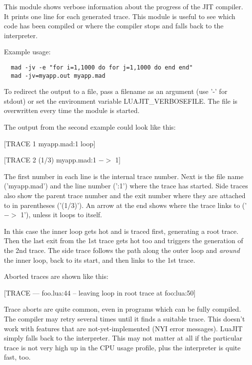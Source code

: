 
This module shows verbose information about the progress of the
JIT compiler. It prints one line for each generated trace. This module
is useful to see which code has been compiled or where the compiler
stops and falls back to the interpreter.

Example usage:

\begin{lstlisting}
  mad -jv -e "for i=1,1000 do for j=1,1000 do end end"
  mad -jv=myapp.out myapp.mad
\end{lstlisting}
To redirect the output to a file, pass a
filename as an argument (use '-' for stdout) or set the environment
variable LUAJIT\_VERBOSEFILE. The file is overwritten every time the
module is started.

The output from the second example could look like this:

\begin{center}
[TRACE   1 myapp.mad:1 loop]

[TRACE   2 (1/3) myapp.mad:1 $->$ 1]
\end{center}

The first number in each line is the internal trace number. Next is
the file name ('myapp.mad') and the line number (':1') where the
trace has started. Side traces also show the parent trace number and
the exit number where they are attached to in parentheses ('(1/3)').
An arrow at the end shows where the trace links to ('$->$ 1'), unless
it loops to itself.

In this case the inner loop gets hot and is traced first, generating
a root trace. Then the last exit from the 1st trace gets hot too
and triggers the generation of the 2nd trace. The side trace follows the
path along the outer loop and \textit{around} the inner loop, back to its
start, and then links to the 1st trace.

Aborted traces are shown like this:
\begin{center}
[TRACE --- foo.lua:44 -- leaving loop in root trace at foo:lua:50]
\end{center}

Trace aborts are quite common, even in programs which
can be fully compiled. The compiler may retry several times until it
finds a suitable trace. This doesn't work with features that are
not-yet-implemented (NYI error messages). LuaJIT simply falls back to the
interpreter. This may not matter at all if the particular trace is not very high
up in the CPU usage profile, plus the interpreter is quite fast, too.